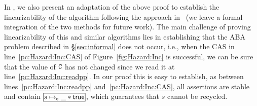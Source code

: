 
In \tr{\ref{app:lin}}{\nlin}, we also present an adaptation of the above proof 
to establish the linearizability of the algorithm following the
approach in~\cite{rgsep} (we leave a formal integration of the two methods for
future work). The main challenge of proving linearizability of this and similar
algorithms lies in establishing that the ABA problem described in
\S\ref{sec:informal} does not occur, i.e., when the CAS in
line~\ref{pc:Hazard:Inc:CAS} of Figure~\ref{fig:Hazard:Inc} is successful, we
can be sure that the value of $\texttt{C}$ has not changed since we read it at
line~\ref{pc:Hazard:Inc:readpp}. In our proof this is easy to establish, as
between lines~\ref{pc:Hazard:Inc:readpp} and~\ref{pc:Hazard:Inc:CAS}, all
assertions are stable and contain $\shareds{s \mapsto_\se \_ * \true}$, which
guarantees that $s$ cannot be recycled.




